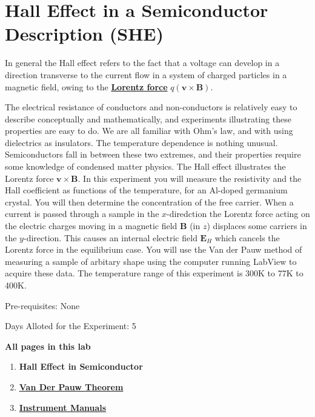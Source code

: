 \documentclass{../lab}
\newcommand{\LorentzForce}{http://www.britannica.com/science/Lorentz-force}
\newcommand{\VanDerPauwTheorem}{http://experimentationlab.berkeley.edu/node/105}
\newcommand{\InstrumentManuals}{http://experimentationlab.berkeley.edu/node/106}
\begin{document}
\maketitle

\tableofcontents

\section{Hall Effect in a Semiconductor Description (SHE)}

In general the Hall effect refers to the fact that a voltage can develop in a direction transverse to the current flow in a system of charged particles in a magnetic field, owing to the \href{\LorentzForce}{\textbf{Lorentz force}} $q(\mathbf{v} \times \mathbf{B})$.

The electrical resistance of conductors and non-conductors is relatively easy to describe conceptually and mathematically, and experiments illustrating these properties are easy to do. We are all familiar with Ohm's law, and with using dielectrics as insulators. The temperature dependence is nothing unusual. Semiconductors fall in between these two extremes, and their properties require some knowledge of condensed matter physics. The Hall effect illustrates the Lorentz force $\mathbf{v} \times \mathbf{B}$. In this experiment you will measure the resistivity and the Hall coefficient as functions of the temperature, for an Al-doped germanium crystal. You will then determine the concentration of the free carrier. When a current is passed through a sample in the $x$-diredction the Lorentz force acting on the electric charges moving in a magnetic field $\mathbf{B}$ (in $z$) displaces some carriers in the $y$-direction. This causes an internal electric field $\mathbf{E}_H$ which cancels the Lorentz force in the equilibrium case. You will use the Van der Pauw method of measuring a sample of arbitary shape using the computer running LabView to acquire these data. The temperature range of this experiment is 300K to 77K to 400K.

Pre-requisites: None

Days Alloted for the Experiment: 5

\noindent\textbf{All pages in this lab}
\begin{enumerate}
    \item\textbf{Hall Effect in Semiconductor}

    \item\href{\VanDerPauwTheorem}{\textbf{Van Der Pauw Theorem}}

    \item\href{\InstrumentManuals}{\textbf{Instrument Manuals}}
\end{enumerate}
\end{document}
